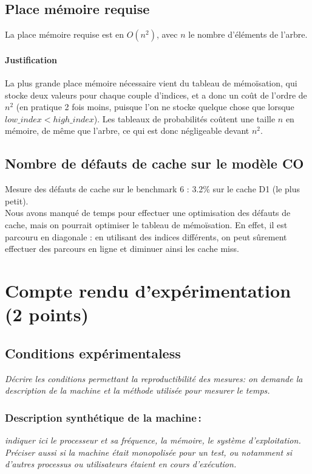 \documentclass[a4paper, 10pt, french]{article}
\begin{document}
  \subsection{Place mémoire requise}
  La place mémoire requise est en $O(n^2)$, avec $n$ le nombre d'éléments de l'arbre.
	\paragraph{Justification}
	La plus grande place mémoire nécessaire vient du tableau de mémoïsation, qui stocke deux valeurs pour chaque couple d'indices, et a donc un coût de l'ordre de $n^2$ (en pratique 2 fois moins, puisque l'on ne stocke quelque chose que lorsque $low\_index < high\_index$).
	Les tableaux de probabilités coûtent une taille $n$ en mémoire, de même que l'arbre, ce qui est donc négligeable devant $n^2$.

  \subsection{Nombre de défauts de cache sur le modèle CO}
	Mesure des défauts de cache sur le benchmark 6 : 3.2\% sur le cache D1 (le plus petit). \\

	Nous avons manqué de temps pour effectuer une optimisation des défauts de cache, mais on pourrait optimiser le tableau de mémoïsation. 
	En effet, il est parcouru en diagonale : en utilisant des indices différents, on peut sûrement effectuer des parcours en ligne et diminuer ainsi les cache miss.

\section{Compte rendu d'expérimentation (2 points)}
  \subsection{Conditions expérimentaless}
	 {\em Décrire les conditions permettant la reproductibilité des mesures: on demande la description
	  de la machine et la méthode utilisée pour mesurer le temps.
	 }

	\subsubsection{Description synthétique de la machine\,:} 
	  {\em indiquer ici le  processeur et sa fréquence, la mémoire, le système d'exploitation. 
	   Préciser aussi si la machine était monopolisée pour un test, ou notamment si 
	   d'autres processus ou utilisateurs étaient en cours d'exécution. 
	  } 
\end{document}
